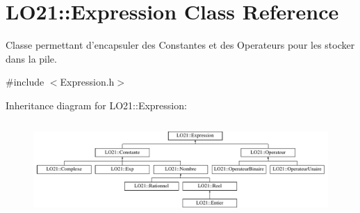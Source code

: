 \hypertarget{class_l_o21_1_1_expression}{\section{\-L\-O21\-:\-:\-Expression \-Class \-Reference}
\label{class_l_o21_1_1_expression}
}


\-Classe permettant d'encapsuler des \-Constantes et des \-Operateurs pour les stocker dans la pile.  




{\ttfamily \#include $<$\-Expression.\-h$>$}

\-Inheritance diagram for \-L\-O21\-:\-:\-Expression\-:\begin{figure}[H]
\begin{center}
\leavevmode
\includegraphics[height=3.612903cm]{class_l_o21_1_1_expression}
\end{center}
\end{figure}
